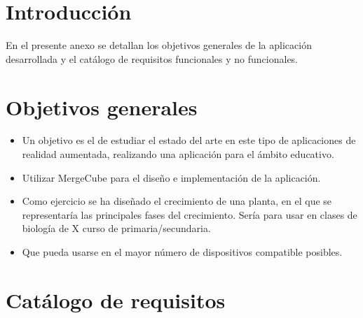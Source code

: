 
\section{Introducción}
En el presente anexo se detallan los objetivos generales de la aplicación desarrollada y el catálogo de requisitos funcionales y no funcionales.
\section{Objetivos generales}
\begin{itemize}
	\item Un objetivo es el de estudiar el estado del arte en este tipo de aplicaciones de realidad aumentada, realizando una aplicación para el ámbito educativo.
	\item Utilizar MergeCube para el diseño e implementación de la aplicación.
	\item Como ejercicio se ha diseñado el crecimiento de una planta, en el que se representaría las principales fases del crecimiento. Sería para usar en clases de biología de X curso de primaria/secundaria.
	\item Que pueda usarse en el mayor número de dispositivos compatible posibles.
\end{itemize}
\section{Catálogo de requisitos}
